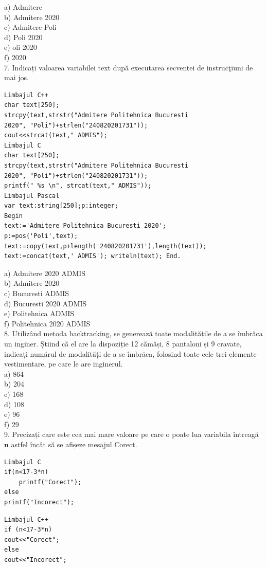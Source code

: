 \documentclass[10pt]{article}
\begin{document}
a) Admitere\\
b) Admitere 2020\\
c) Admitere Poli\\
d) Poli 2020\\
e) oli 2020\\
f) 2020\\
7. Indicați valoarea variabilei text după executarea secvenței de instrucţiuni de mai jos.

\begin{verbatim}
Limbajul C++
char text[250];
strcpy(text,strstr("Admitere Politehnica Bucuresti
2020", "Poli")+strlen("240820201731"));
cout<<strcat(text," ADMIS");
Limbajul C
char text[250];
strcpy(text,strstr("Admitere Politehnica Bucuresti
2020", "Poli")+strlen("240820201731"));
printf(" %s \n", strcat(text," ADMIS"));
Limbajul Pascal
var text:string[250];p:integer;
Begin
text:='Admitere Politehnica Bucuresti 2020';
p:=pos('Poli',text);
text:=copy(text,p+length('240820201731'),length(text));
text:=concat(text,' ADMIS'); writeln(text); End.
\end{verbatim}

a) Admitere 2020 ADMIS\\
b) Admitere 2020\\
c) Bucuresti ADMIS\\
d) Bucuresti 2020 ADMIS\\
e) Politehnica ADMIS\\
f) Politehnica 2020 ADMIS\\
8. Utilizând metoda backtracking, se generează toate modalitățile de a se îmbrăca un inginer. Ș̦tiind că el are la dispoziție 12 cămăși, 8 pantaloni și 9 cravate, indicați numărul de modalități de a se îmbrăca, folosind toate cele trei elemente vestimentare, pe care le are inginerul.\\
a) 864\\
b) 204\\
c) 168\\
d) 108\\
e) 96\\
f) 29\\
9. Precizați care este cea mai mare valoare pe care o poate lua variabila întreagă $\mathbf{n}$ astfel încât să se afișeze mesajul Corect.

\begin{verbatim}
Limbajul C
if(n<17-3*n)
    printf("Corect");
else
printf("Incorect");
\end{verbatim}

\begin{verbatim}
Limbajul C++
if (n<17-3*n)
cout<<"Corect";
else
cout<<"Incorect";
\end{verbatim}
\end{document}
